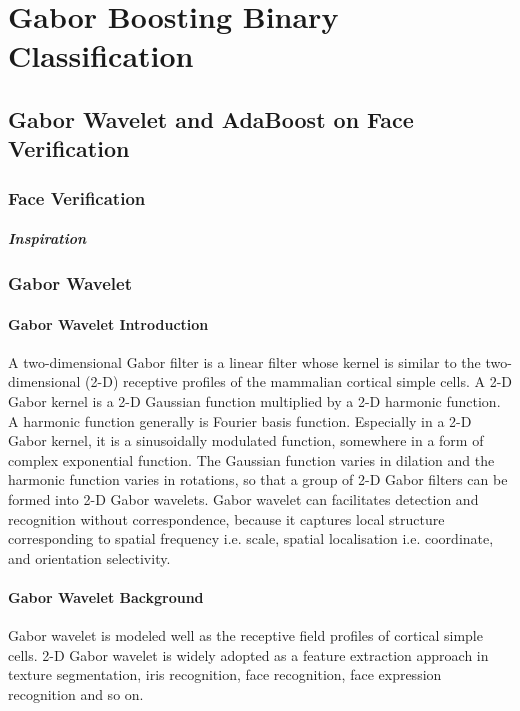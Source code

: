 \chapter{Gabor Boosting Binary Classification}
\label{ch:bin}

\section{Gabor Wavelet and AdaBoost on Face Verification}
\label{sec:faceveri}
\subsection{Face Verification}
\paragraph{Inspiration}
\subsection{Gabor Wavelet}
\label{sec:faceveri:gabor}
\subsubsection{Gabor Wavelet Introduction}
A two-dimensional Gabor filter is a linear filter whose kernel is similar to the two-dimensional (2-D) receptive profiles of the mammalian cortical simple cells\cite{}. A 2-D Gabor kernel is a 2-D Gaussian function multiplied by a 2-D harmonic function. A harmonic function generally is Fourier basis function. Especially in a 2-D Gabor kernel, it is a sinusoidally modulated function, somewhere in a form of complex exponential function. The Gaussian function varies in dilation and the harmonic function varies in rotations, so that a group of 2-D Gabor filters can be formed into 2-D Gabor wavelets. Gabor wavelet can facilitates detection and recognition without correspondence, because it captures local structure corresponding to spatial frequency i.e. scale, spatial localisation i.e. coordinate, and orientation selectivity.
\subsubsection{Gabor Wavelet Background}
Gabor wavelet is modeled well as the receptive field profiles of cortical simple cells\cite{}. 2-D Gabor wavelet is widely adopted as a feature extraction approach in texture segmentation, iris recognition, face recognition, face expression recognition and so on. 

